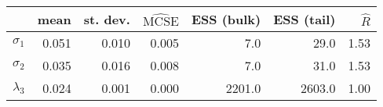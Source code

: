 \begin{tabular}{lrrrrrr}
\toprule
{} &   mean &  st. dev. &  $\widehat{\mathrm{MCSE}}$ &  ESS (bulk) &  ESS (tail) &  $\widehat{R}$ \\
\midrule
$\sigma_1$  &  0.051 &     0.010 &                      0.005 &         7.0 &        29.0 &           1.53 \\
$\sigma_2$  &  0.035 &     0.016 &                      0.008 &         7.0 &        31.0 &           1.53 \\
$\lambda_3$ &  0.024 &     0.001 &                      0.000 &      2201.0 &      2603.0 &           1.00 \\
\bottomrule
\end{tabular}

